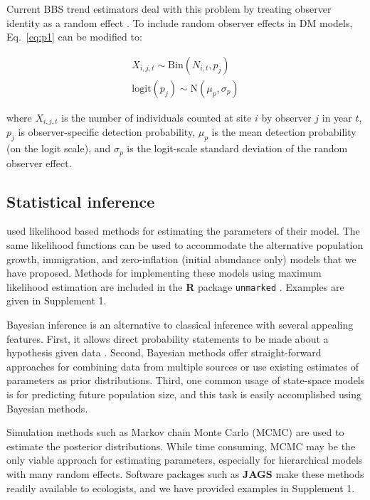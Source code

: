 \documentclass[12pt,english]{article}
\begin{document}
\begin{spacing}{1.9}
\begin{flushleft}
Current BBS trend estimators deal with this problem by
treating observer identity as a random 
effect \citep{link_sauer:2002,sauer_link:2011}.
To include random observer effects in DM models, 
Eq.~\ref{eq:p1} can be modified to:
\begin{linenomath*}
\begin{gather}
X_{i,j,t} \sim \mathrm{Bin}(N_{i,t}, p_j) \nonumber \\
\mathrm{logit}(p_j) \sim \mathrm{N}(\mu_p, \sigma_p)
\label{eq:pobs}
\end{gather}
\end{linenomath*}
where $X_{i,j,t}$ is the number of individuals counted at site $i$ by
observer $j$ in year $t$, $p_j$ is observer-specific detection probability,
$\mu_p$ is the mean detection probability (on the logit scale), and $\sigma_p$ is
the logit-scale standard deviation of the random observer effect. %

\subsection*{Statistical inference}

\citet{dail_madsen:2011} used likelihood based methods for estimating
the parameters of their model. The same likelihood functions can be
used to accommodate the alternative population growth, immigration, and 
zero-inflation (initial abundance only) models that we
have proposed. Methods for implementing these models using maximum 
likelihood estimation are included in the 
\textbf{R} package \texttt{unmarked} \citep{fiske_chandler:2011}. Examples
are given in Supplement 1.

Bayesian inference is an alternative to classical inference with
several appealing features. First, it allows direct probability
statements to be made about a hypothesis given data
\citep{link_barker:2010}.  Second, Bayesian methods offer
straight-forward approaches for combining data from multiple sources
or use existing estimates of parameters as prior distributions. Third,
one common usage of state-space models is for predicting future
population size, and this task is easily accomplished using Bayesian
methods.

Simulation methods such as Markov chain Monte Carlo (MCMC)
are used to estimate the posterior distributions. While time %
consuming, MCMC may be the only viable approach for estimating
parameters, especially for hierarchical models with many random
effects.  
Software packages such as 
\textbf{JAGS} \citep{plummer:2003} make these methods readily
available to ecologists, and we have provided examples in 
Supplement 1. 



\end{flushleft}
\end{spacing}
\end{document}

